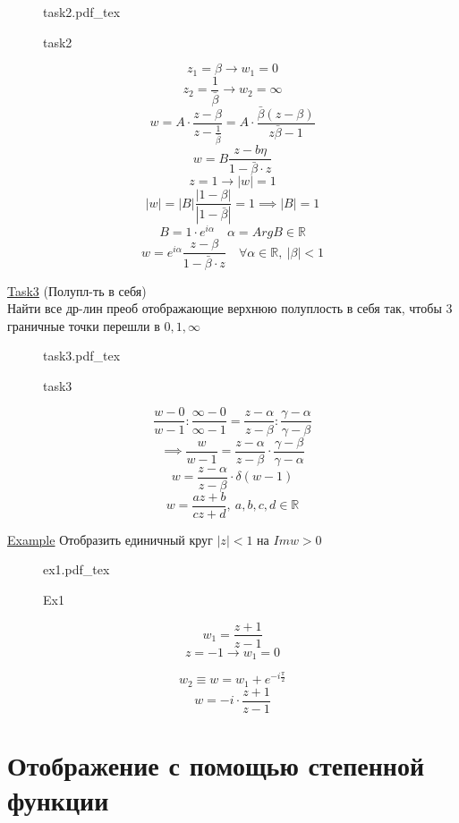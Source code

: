 \documentclass[a4paper]{article}
\newcommand{\incfig}[1]{%
\def\svgwidth{\columnwidth}
{#1.pdf_tex}
}
\begin{document}
\begin{figure}[!ht]
    \centering
    \incfig{task2}
    \caption{task2}
\end{figure}

\[
    z_1 = \beta \to w_1 = 0
\]
\[
    z_2 = \frac{1}{\bar{\beta}} \to w_2 = \infty
\]
\[
    w = A \cdot \frac{z-\beta}{z-\frac{1}{\bar{\beta}} } = A \cdot 
    \frac{\bar{\beta}(z -\beta)}{z\bar{\beta} - 1} 
\]
\[
    w = B \frac{z-b\eta}{1 - \bar{\beta}\cdot z} 
\]
\[
    z = 1 \to |w| = 1
\]
\[
    |w| = |B| \frac{|1 - \beta|}{|1 - \bar{\beta}|} = 1 \implies
    |B| = 1
\]
\[
    B = 1 \cdot e^{i\alpha} \quad \alpha = Arg B \in \mathbb{R}
\]
\[
    w = e^{i\alpha}\frac{z - \beta}{1 - \bar{\beta} \cdot z} \quad \forall
    \alpha \in \mathbb{R}, \ |\beta| < 1
\]

\begin{tcolorbox}
\underline{Task3} (Полупл-ть в себя)\\
Найти все др-лин преоб отображающие верхнюю полуплость в себя так, чтобы 3 граничные
точки перешли в $ 0, 1, \infty $ 
\end{tcolorbox}

\begin{figure}[!ht]
    \centering
    \incfig{task3}
    \caption{task3}
    \label{fig:task3}
\end{figure}

\[
    \frac{w - 0}{w - 1} : \frac{\infty - 0}{\infty - 1} = 
    \frac{z - \alpha}{z - \beta} : \frac{\gamma - \alpha}{\gamma - \beta} 
\]
\[
    \implies \frac{w}{w - 1} = \frac{z - \alpha}{z - \beta} \cdot 
    \frac{\gamma - \beta}{\gamma - \alpha} 
\]
\[
    w = \frac{z - \alpha}{z - \beta} \cdot \delta(w - 1)
\]
\[
    w = \frac{az + b}{cz + d} , \ a,b,c,d \in \mathbb{R}
\]

\underline{Example} Отобразить единичный круг $ |z| < 1 $ на $ Im w > 0 $ 
\begin{figure}[!ht]
    \centering
    \incfig{ex1}
    \caption{Ex1}
    \label{fig:ex1}
\end{figure}

\[
    w_1 = \frac{z + 1}{z - 1} 
\]
\[
    z = -1 \to w_1 = 0
\]

\[
    w_2 \equiv w = w_1 + e^{-i \frac{\pi}{2}}
\]
\[
    w = -i \cdot \frac{z + 1}{z - 1} 
\]

\section*{\centering Отображение с помощью степенной функции}
\end{document}
